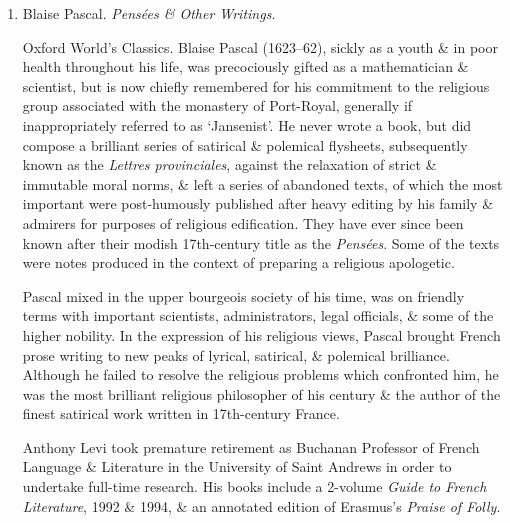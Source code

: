 \documentclass{article}
\begin{document}
\begin{enumerate}
	
	\item {\sc Blaise Pascal}. {\it Pens\'ees \& Other Writings}.
	
	{\sf Oxford World's Classics.} {\sc Blaise Pascal} (1623--62), sickly as a youth \& in poor health throughout his life, was precociously gifted as a mathematician \& scientist, but is now chiefly remembered for his commitment to the religious group associated with the monastery of Port-Royal, generally if inappropriately referred to as `Jansenist'. He never wrote a book, but did compose a brilliant series of satirical \& polemical flysheets, subsequently known as the {\it Lettres provinciales}, against the relaxation of strict \& immutable moral norms, \& left a series of abandoned texts, of which the most important were post-humously published after heavy editing by his family \& admirers for purposes of religious edification. They have ever since been known after their modish 17th-century title as the {\it Pens\'ees}. Some of the texts were notes produced in the context of preparing a religious apologetic.
	
	{\sc Pascal} mixed in the upper bourgeois society of his time, was on friendly terms with important scientists, administrators, legal officials, \& some of the higher nobility. In the expression of his religious views, {\sc Pascal} brought French prose writing to new peaks of lyrical, satirical, \& polemical brilliance. Although he failed to resolve the religious problems which confronted him, he was the most brilliant religious philosopher of his century \& the author of the finest satirical work written in 17th-century France.
	
	{\sc Anthony Levi} took premature retirement as Buchanan Professor of French Language \& Literature in the University of Saint Andrews in order to undertake full-time research. His books include a 2-volume {\it Guide to French Literature}, 1992 \& 1994, \& an annotated edition of {\sc Erasmus}'s {\it Praise of Folly}.
	

\end{enumerate}
\end{document}
